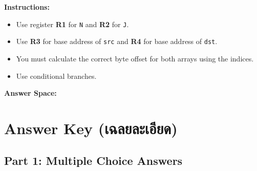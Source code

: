 \documentclass[a4paper,12pt]{article}
\begin{document}
\textbf{Instructions:}
\begin{itemize}
    \item Use register \textbf{R1} for \texttt{N} and \textbf{R2} for \texttt{J}.
    \item Use \textbf{R3} for base address of \texttt{src} and \textbf{R4} for base address of \texttt{dst}.
    \item You must calculate the correct byte offset for both arrays using the indices.
    \item Use conditional branches.
\end{itemize}

\vspace{0.5cm}
\textbf{Answer Space:}
\vspace{8cm}

\newpage

\section*{Answer Key (เฉลยละเอียด)}

\subsection*{Part 1: Multiple Choice Answers}
\end{document}
